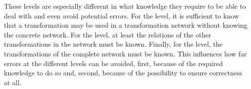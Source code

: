 These levels are especially different in what knowledge they require to be able to deal with and even avoid potential errors.
For the \leveltransformation level, it is sufficient to know that a transformation may be used in a transformation network without knowing the concrete network.
For the \levelnetworkrelation level, at least the relations of the other transformations in the network must be known.
Finally, for the \levelnetworkrule level, the transformations of the complete network must be known.
This influences how far errors at the different levels can be avoided, first, because of the required knowledge to do so and, second, because of the possibility to ensure correctness at all.




